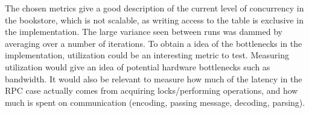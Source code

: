 \documentclass[12pt]{article}
\begin{document}
The chosen metrics give a good description of the current level of concurrency in the bookstore, which is not scalable, as writing access to the table is exclusive in the implementation. The large variance seen between runs was dammed by averaging over a number of iterations.
To obtain a idea of the bottlenecks in the implementation, utilization could be an interesting metric to test. Measuring utilization would give an idea of potential hardware bottlenecks such as bandwidth. It would also be relevant to measure how much of the latency in the RPC case actually comes from acquiring locks/performing operations, and how much is spent on communication (encoding, passing message, decoding, parsing).
\end{document}

